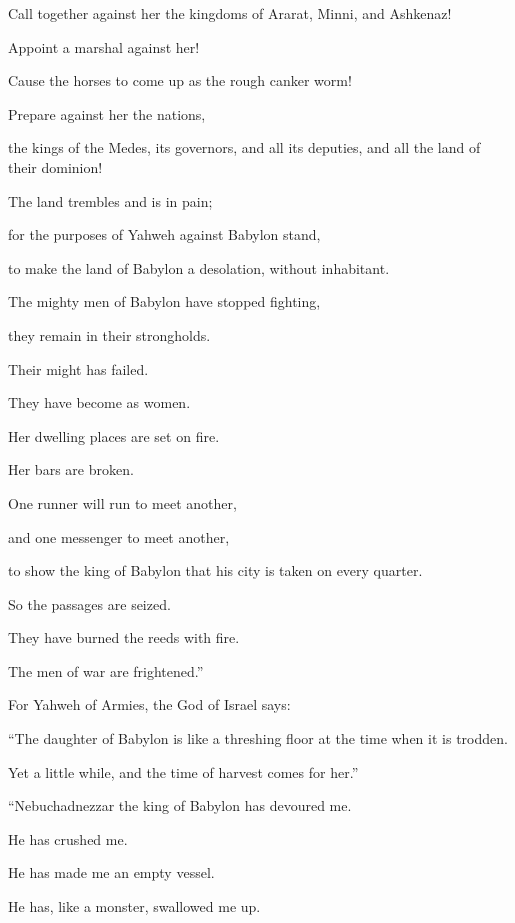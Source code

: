 {\par }{\QB Call together against her the kingdoms of Ararat, Minni, and Ashkenaz!
\par }{\Q Appoint a marshal against her!
\par }{\QB Cause the horses to come up as the rough canker worm!
\par }{\Q {}Prepare against her the nations,
\par }{\QB the kings of the Medes, its governors, and all its deputies, and all the land of their dominion!
\par }{\Q {}The land trembles and is in pain;
\par }{\QB for the purposes of Yahweh against Babylon stand,
\par }{\QB to make the land of Babylon a desolation, without inhabitant.
\par }{\Q {}The mighty men of Babylon have stopped fighting,
\par }{\QB they remain in their strongholds.
\par }{\Q Their might has failed.
\par }{\QB They have become as women.
\par }{\Q Her dwelling places are set on fire.
\par }{\QB Her bars are broken.
\par }{\Q {}One runner will run to meet another,
\par }{\QB and one messenger to meet another,
\par }{\QB to show the king of Babylon that his city is taken on every quarter.
\par }{\Q {}So the passages are seized.
\par }{\QB They have burned the reeds with fire.
\par }{\QB The men of war are frightened.”
\par }{\PP {}For Yahweh of Armies, the God of Israel says:
\par }{\Q “The daughter of Babylon is like a threshing floor at the time when it is trodden.
\par }{\QB Yet a little while, and the time of harvest comes for her.”
\par }{\BB \par }{\Q {}“Nebuchadnezzar the king of Babylon has devoured me.
\par }{\QB He has crushed me.
\par }{\QB He has made me an empty vessel.
\par }{\Q He has, like a monster, swallowed me up.
}
